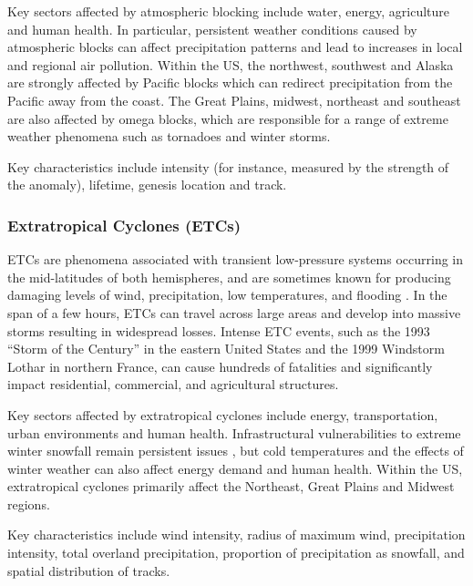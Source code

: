 \documentclass[11pt]{article}
\newcommand\citep{\cite}
\begin{document}

Key sectors affected by atmospheric blocking include water, energy, agriculture and human health.  In particular, persistent weather conditions caused by atmospheric blocks can affect precipitation patterns and lead to increases in local and regional air pollution.  Within the US, the northwest, southwest and Alaska are strongly affected by Pacific blocks which can redirect precipitation from the Pacific away from the coast.  The Great Plains, midwest, northeast and southeast are also affected by omega blocks, which are responsible for a range of extreme weather phenomena such as tornadoes and winter storms.

Key characteristics include intensity (for instance{\color{blue},}  measured by the strength of the anomaly), lifetime, genesis location and track.

\subsubsection*{Extratropical Cyclones (ETCs)}

ETCs are phenomena associated with transient low-pressure systems occurring in the mid-latitudes of both hemispheres, and are sometimes known for producing damaging levels of wind, precipitation, low temperatures, and flooding \citep{serreze1995climatological, ulbrich2009extra}. In the span of a few hours, ETCs can travel across large areas and develop into massive storms resulting in widespread losses. Intense ETC events, such as the 1993 ``Storm of the Century'' in the eastern United States and the 1999 Windstorm Lothar in northern France, can cause hundreds of fatalities and significantly impact residential, commercial, and agricultural structures.

Key sectors affected by extratropical cyclones include energy, transportation, urban environments and human health.  Infrastructural vulnerabilities to extreme winter snowfall {\color{blue}remain persistent issues} , but  cold temperatures and the effects of winter weather can also affect energy demand and human health.  Within the US, extratropical cyclones primarily affect the Northeast, Great Plains and Midwest regions.

Key characteristics include wind intensity, radius of maximum wind, precipitation intensity, total overland precipitation, proportion of precipitation as snowfall, and spatial distribution of tracks.
\end{document}
